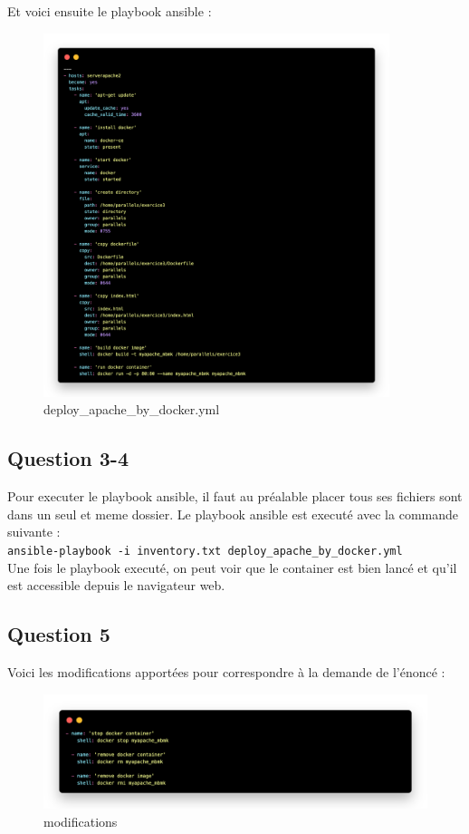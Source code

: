\documentclass[12pt, a4paper]{article}
\begin{document}
Et voici ensuite le playbook ansible :
\begin{figure}[h]
	\centering
	\includegraphics[width=0.9\textwidth]{img/playbook.png}
	\caption{deploy\_apache\_by\_docker.yml}
	\label{fig:3}
\end{figure}

\newpage
\subsection{Question 3-4}
Pour executer le playbook ansible, il faut au préalable placer tous ses fichiers sont 
dans un seul et meme dossier. Le playbook ansible est executé avec la commande suivante :\\

\texttt{ansible-playbook -i inventory.txt deploy\_apache\_by\_docker.yml}\\

Une fois le playbook executé, on peut voir que le container est bien lancé et qu'il est accessible depuis le navigateur web.

\subsection{Question 5}
Voici les modifications apportées pour correspondre à la demande de l'énoncé :\\
\begin{figure}[h]
	\centering
	\includegraphics[width=1\textwidth]{img/modif.png}
	\caption{modifications}
	\label{fig:4}
\end{figure}
\end{document}
